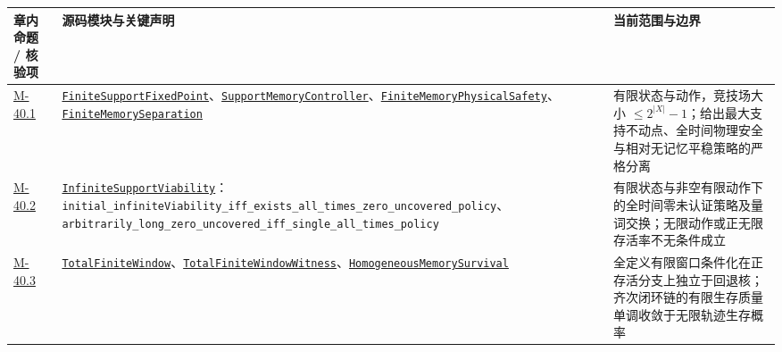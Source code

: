 \documentclass[
  11pt,
  oneside]{book}
\newcounter{none} %
\begin{document}
{\def\LTcaptype{none} %
\begin{longtable}[]{@{}
  >{\raggedright\arraybackslash}p{}
  >{\raggedright\arraybackslash}p{}
  >{\raggedright\arraybackslash}p{}@{}}
\toprule\noalign{}
\begin{minipage}[b]{\linewidth}\raggedright
章内命题 / 核验项
\end{minipage} & \begin{minipage}[b]{\linewidth}\raggedright
源码模块与关键声明
\end{minipage} & \begin{minipage}[b]{\linewidth}\raggedright
当前范围与边界
\end{minipage} \\
\midrule\noalign{}
\endhead
\bottomrule\noalign{}
\endlastfoot
\hyperref[m-40-1]{M-40.1} & \href{../formalization/ueot-core/UEOT/V3/Compression/TheoryCompletion/UnifiedClosure/FiniteSupportFixedPoint.lean}{\nolinkurl{FiniteSupportFixedPoint}}、\href{../formalization/ueot-core/UEOT/V3/Compression/TheoryCompletion/UnifiedClosure/SupportMemoryController.lean}{\nolinkurl{SupportMemoryController}}、\href{../formalization/ueot-core/UEOT/V3/Compression/TheoryCompletion/UnifiedClosure/FiniteMemoryPhysicalSafety.lean}{\nolinkurl{FiniteMemoryPhysicalSafety}}、\href{../formalization/ueot-core/UEOT/V3/Compression/TheoryCompletion/UnifiedClosure/FiniteMemorySeparation.lean}{\nolinkurl{FiniteMemorySeparation}} & 有限状态与动作，竞技场大小 \(\le 2^{|X|}-1\)；给出最大支持不动点、全时间物理安全与相对无记忆平稳策略的严格分离 \\
\hyperref[m-40-2]{M-40.2} & \href{../formalization/ueot-core/UEOT/V3/Compression/TheoryCompletion/UnifiedClosure/InfiniteSupportViability.lean}{\nolinkurl{InfiniteSupportViability}}：\nolinkurl{initial_infiniteViability_iff_exists_all_times_zero_uncovered_policy}、\nolinkurl{arbitrarily_long_zero_uncovered_iff_single_all_times_policy} & 有限状态与非空有限动作下的全时间零未认证策略及量词交换；无限动作或正无限存活率不无条件成立 \\
\hyperref[m-40-3]{M-40.3} & \href{../formalization/ueot-core/UEOT/V3/Compression/TheoryCompletion/UnifiedClosure/TotalFiniteWindow.lean}{\nolinkurl{TotalFiniteWindow}}、\href{../formalization/ueot-core/UEOT/V3/Compression/TheoryCompletion/UnifiedClosure/TotalFiniteWindowWitness.lean}{\nolinkurl{TotalFiniteWindowWitness}}、\href{../formalization/ueot-core/UEOT/V3/Compression/TheoryCompletion/UnifiedClosure/HomogeneousMemorySurvival.lean}{\nolinkurl{HomogeneousMemorySurvival}} & 全定义有限窗口条件化在正存活分支上独立于回退核；齐次闭环链的有限生存质量单调收敛于无限轨迹生存概率 \\

\end{longtable}}
\end{document}

